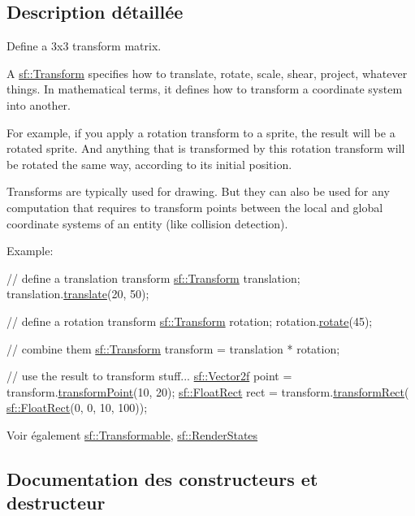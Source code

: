 \subsection{Description détaillée}
Define a 3x3 transform matrix. 

A \hyperlink{classsf_1_1Transform}{sf\+::\+Transform} specifies how to translate, rotate, scale, shear, project, whatever things. In mathematical terms, it defines how to transform a coordinate system into another.

For example, if you apply a rotation transform to a sprite, the result will be a rotated sprite. And anything that is transformed by this rotation transform will be rotated the same way, according to its initial position.

Transforms are typically used for drawing. But they can also be used for any computation that requires to transform points between the local and global coordinate systems of an entity (like collision detection).

Example\+: 
\begin{DoxyCode}
\textcolor{comment}{// define a translation transform}
\hyperlink{classsf_1_1Transform}{sf::Transform} translation;
translation.\hyperlink{classsf_1_1Transform_ab54f6c8070cc05e2afcb3145fbf4395a}{translate}(20, 50);

\textcolor{comment}{// define a rotation transform}
\hyperlink{classsf_1_1Transform}{sf::Transform} rotation;
rotation.\hyperlink{classsf_1_1Transform_a3e548c3c9e3fb9d4bd43cf852669e555}{rotate}(45);

\textcolor{comment}{// combine them}
\hyperlink{classsf_1_1Transform}{sf::Transform} transform = translation * rotation;

\textcolor{comment}{// use the result to transform stuff...}
\hyperlink{classsf_1_1Vector2}{sf::Vector2f} point = transform.\hyperlink{classsf_1_1Transform_af2e38c3c077d28898686662558b41135}{transformPoint}(10, 20);
\hyperlink{classsf_1_1Rect}{sf::FloatRect} rect = transform.\hyperlink{classsf_1_1Transform_a3824a20505d81a94bc22be1ffee57d3d}{transformRect}(
      \hyperlink{classsf_1_1Rect}{sf::FloatRect}(0, 0, 10, 100));
\end{DoxyCode}


\begin{DoxySeeAlso}{Voir également}
\hyperlink{classsf_1_1Transformable}{sf\+::\+Transformable}, \hyperlink{classsf_1_1RenderStates}{sf\+::\+Render\+States} 
\end{DoxySeeAlso}


\subsection{Documentation des constructeurs et destructeur}
\mbox{\label{classsf_1_1Transform_ac32de51bd0b9f3d52fbe0838225ee83b}} 
